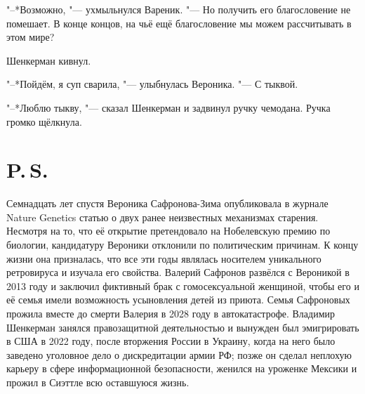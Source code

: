"--*Возможно, "--- ухмыльнулся Вареник.
"--- Но получить его благословение не помешает.
В конце концов, на чьё ещё благословение мы можем рассчитывать в этом мире?

Шенкерман кивнул.

"--*Пойдём, я суп сварила, "--- улыбнулась Вероника.
"--- С тыквой.

"--*Люблю тыкву, "--- сказал Шенкерман и задвинул ручку чемодана.
Ручка громко щёлкнула.

\chapter*{P.\,S.}

Семнадцать лет спустя Вероника Сафронова-Зима опубликовала в журнале Nature Genetics статью о двух ранее неизвестных механизмах старения.
Несмотря на то, что её открытие претендовало на Нобелевскую премию по биологии, кандидатуру Вероники отклонили по политическим причинам.
К концу жизни она призналась, что все эти годы являлась носителем уникального ретровируса и изучала его свойства.
Валерий Сафронов развёлся с Вероникой в 2013 году и заключил фиктивный брак с гомосексуальной женщиной, чтобы его и её семья имели возможность усыновления детей из приюта.
Семья Сафроновых прожила вместе до смерти Валерия в 2028 году в автокатастрофе.
Владимир Шенкерман занялся правозащитной деятельностью и вынужден был эмигрировать в США в 2022 году, после вторжения России в Украину, когда на него было заведено уголовное дело о дискредитации армии РФ;
позже он сделал неплохую карьеру в сфере информационной безопасности, женился на уроженке Мексики и прожил в Сиэттле всю оставшуюся жизнь.


